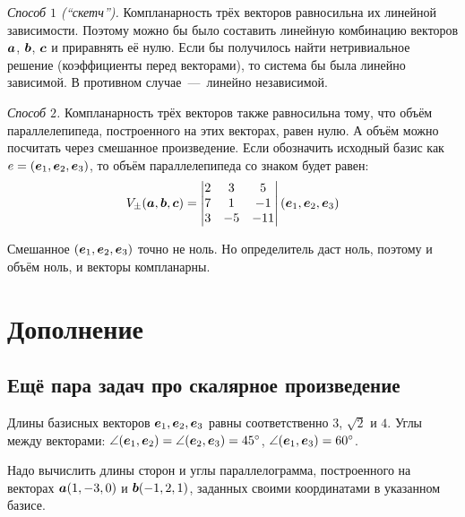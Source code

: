\documentclass[a4paper,12pt]{article}
\begin{document}
  \begin{solution}
    \leavevmode
    
    \emph{Способ $1$ (``скетч'').}
    Компланарность трёх векторов равносильна их линейной зависимости.
    Поэтому можно бы было составить линейную комбинацию векторов $\boldsymbol a$, $\boldsymbol b$, $\boldsymbol c$ и приравнять её нулю.
    Если бы получилось найти нетривиальное решение (коэффициенты перед векторами), то система бы была линейно зависимой.
    В противном случае~---~линейно независимой.
    
    \medskip
    
    \emph{Способ $2$.}
    Компланарность трёх векторов также равносильна тому, что объём параллелепипеда, построенного на этих векторах, равен нулю.
    А объём можно посчитать через смешанное произведение.
    Если обозначить исходный базис как $e \hm= (\bds e_1, \bds e_2, \bds e_3)$, то объём параллелепипеда со знаком будет равен:
    \[
      V_{\pm}(\boldsymbol a, \boldsymbol b, \boldsymbol c) = \begin{vmatrix}
        2 & 3 & 5\\
        7 & 1 & -1\\
        3 & -5 & -11
      \end{vmatrix} (\boldsymbol e_1, \boldsymbol e_2, \boldsymbol e_3)
    \]
    
    Смешанное $(\boldsymbol e_1, \boldsymbol e_2, \boldsymbol e_3)$ точно не ноль.
    Но определитель даст ноль, поэтому и объём ноль, и векторы компланарны.
  \end{solution}
  
  
  \section{Дополнение}
  
  \subsection{Ещё пара задач про скалярное произведение}
  
  \begin{problem}
    Длины базисных векторов $\boldsymbol e_1, \boldsymbol e_2, \boldsymbol e_3$ равны соответственно $3$, $\sqrt{2}$ и $4$.
    Углы между векторами: $\angle (\bds e_1, \bds e_2) \hm= \angle (\bds e_2, \bds e_3) \hm= 45\degree$, $\angle (\bds e_1, \bds e_3) \hm= 60\degree$.
    
    Надо вычислить длины сторон и углы параллелограмма, построенного на векторах $\boldsymbol a (1, -3, 0)$ и $\boldsymbol b (-1, 2, 1)$, заданных своими координатами в указанном базисе.
  \end{problem}
  
\end{document}
